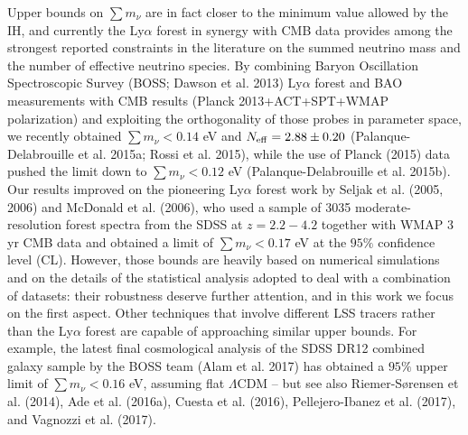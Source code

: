 \documentclass{emulateapj}
\begin{document}
Upper bounds on $\sum m_{\nu}$ are in fact closer to the minimum value allowed by the IH, and currently the Ly$\alpha$ forest in synergy with CMB data 
provides among the strongest reported constraints in the literature on the summed neutrino mass and the number of effective neutrino species.
By combining  Baryon Oscillation Spectroscopic Survey (BOSS; Dawson et al. 2013) Ly$\alpha$ forest and BAO measurements with CMB results (Planck 2013+ACT+SPT+WMAP polarization) and exploiting the orthogonality of those probes in parameter space, we recently 
obtained $\sum m_{\nu} < 0.14$ eV and  
$N_{\rm eff} = 2.88 \pm 0.20$ (Palanque-Delabrouille et al. 2015a; Rossi et al. 2015), while the use of Planck (2015)  data pushed the limit down to $\sum m_{\nu} < 0.12$ eV (Palanque-Delabrouille et al. 2015b).
Our  results improved on the 
pioneering Ly$\alpha$ forest work by Seljak et al. (2005, 2006) and McDonald et al. (2006),
who used a sample of 3035 moderate-resolution forest spectra from the SDSS at $z = 2.2-4.2$ together with WMAP 3 yr CMB data
and obtained a limit of $\sum m_{\nu} < 0.17$ eV at the $95\%$ confidence level (CL). 
However, those bounds are heavily based on numerical simulations and on the details of the statistical analysis adopted to deal with a combination of datasets: their robustness deserve further attention, and in this work we focus  on the first aspect.  
Other techniques that involve different LSS tracers rather than the Ly$\alpha$ forest  are capable of approaching similar upper bounds. 
For example, the latest final cosmological analysis of the SDSS DR12 combined galaxy sample by the BOSS team (Alam et al. 2017) has obtained 
a $95\%$ upper limit of $\sum m_{\nu} < 0.16$ eV, assuming flat $\Lambda$CDM -- but see also 
Riemer-S{\o}rensen et al. (2014), Ade et al. (2016a), Cuesta et al. (2016),
Pellejero-Ibanez et al. (2017), and Vagnozzi et al. (2017). 
 
\end{document}
